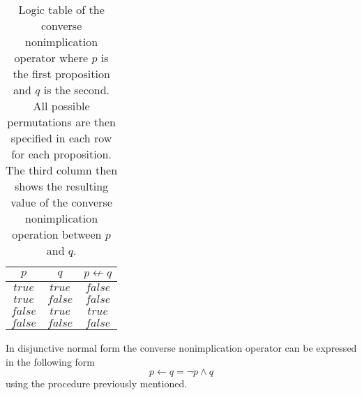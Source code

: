                 \begin{table}[h!]
                    \centering
                    \begin{tabular}{|c|c|c|}
                    	\hline
                    	  $p$   &   $q$   & $p \not\leftarrow q$ \\ \hline
                    	$true$  & $true$  &       $false$        \\ \hline
                    	$true$  & $false$ &       $false$        \\ \hline
                    	$false$ & $true$  &        $true$        \\ \hline
                    	$false$ & $false$ &       $false$        \\ \hline
                    \end{tabular}
                    \caption{Logic table of the converse nonimplication operator where $p$ is the first proposition and $q$ is the second. All possible permutations are then specified in each row for each proposition. The third column then shows the resulting value of the converse nonimplication operation between $p$ and $q$.}
                    \label{LogicTable:CNI}
                \end{table}
                
                In disjunctive normal form the converse nonimplication operator can be expressed in the following form
                \begin{equation}
                p \leftarrow q =\neg p \wedge q
                \end{equation}
                using the procedure previously mentioned.
                
                
                
